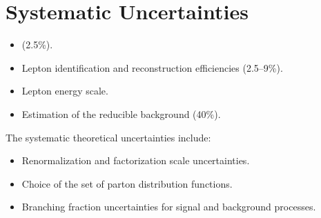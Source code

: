 \section{Systematic Uncertainties}
\label{sec:syst_uncert}
\begin{itemize}
	\item \lumiint (2.5\%). %
	\item Lepton identification and reconstruction efficiencies (2.5--9\%). %
	\item Lepton energy scale. %
	\item Estimation of the reducible background (40\%). %
\end{itemize}
The systematic theoretical uncertainties include:
\begin{itemize}
	\item Renormalization and factorization scale uncertainties.  %
	\item Choice of the set of parton distribution functions. %
	\item Branching fraction uncertainties for signal and background processes. %
\end{itemize}